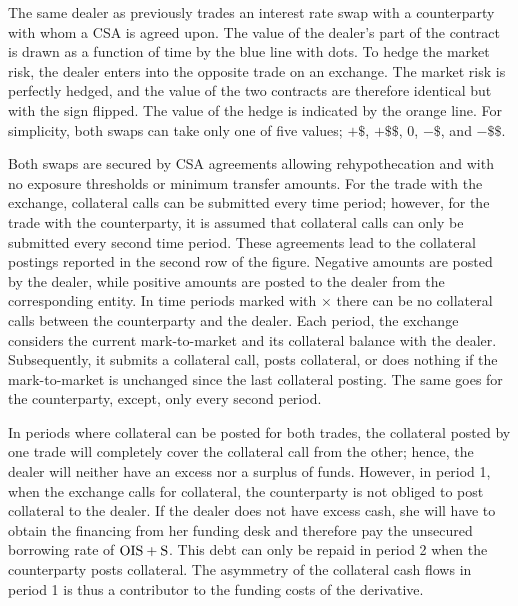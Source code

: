 \documentclass[main.tex]{subfiles}
\begin{document}
        \begin{example}
        The same dealer as previously trades an interest rate swap with a counterparty with whom a CSA is agreed upon. 
        The value of the dealer's part of the contract is drawn as a function of time 
        by the \textcolor{wtf-blue}{blue line} with dots.
        To hedge the market risk, the dealer enters into the opposite trade on an exchange.
        The market risk is perfectly hedged, 
        and the value of the two contracts are therefore identical but with the sign flipped.
        The value of the hedge is indicated by the \textcolor{wtf-orange}{orange line}.
        For simplicity, both swaps can take only one of five values; $+\$$, $+\$\$$, $0$, $-\$$, and $-\$\$$.

        Both swaps are secured by CSA agreements allowing rehypothecation 
        and with no exposure thresholds or minimum transfer amounts.
        For the trade with the exchange, collateral calls can be submitted every time period;
        however, for the trade with the counterparty, it is assumed that
        collateral calls can only be submitted every second time period.
        These agreements lead to the collateral postings reported in the second row of the figure.
        Negative amounts are posted by the dealer, while positive amounts are posted to the dealer 
        from the corresponding entity.
        In time periods marked with $\boldsymbol{\times}$ 
        there can be no collateral calls between the counterparty and the dealer.
        Each period, the exchange considers the current mark-to-market and its collateral balance with the dealer.
        Subsequently, it submits a collateral call, posts collateral, 
        or does nothing if the mark-to-market is unchanged since the last collateral posting.
        The same goes for the counterparty, except, only every second period.

        In periods where collateral can be posted for both trades, 
        the collateral posted by one trade will completely cover the collateral call from the other;
        hence, the dealer will neither have an excess nor a surplus of funds.
        However, in period 1, when the exchange calls for collateral,
        the counterparty is not obliged to post collateral to the dealer. 
        If the dealer does not have excess cash, 
        she will have to obtain the financing from her funding desk
        and therefore pay the unsecured borrowing rate of $\OIS/ + \text{S}$. 
        This debt can only be repaid in period 2 when the counterparty posts collateral.
        The asymmetry of the collateral cash flows in period 1
        is thus a contributor to the funding costs of the derivative.


\end{example}
\end{document}
